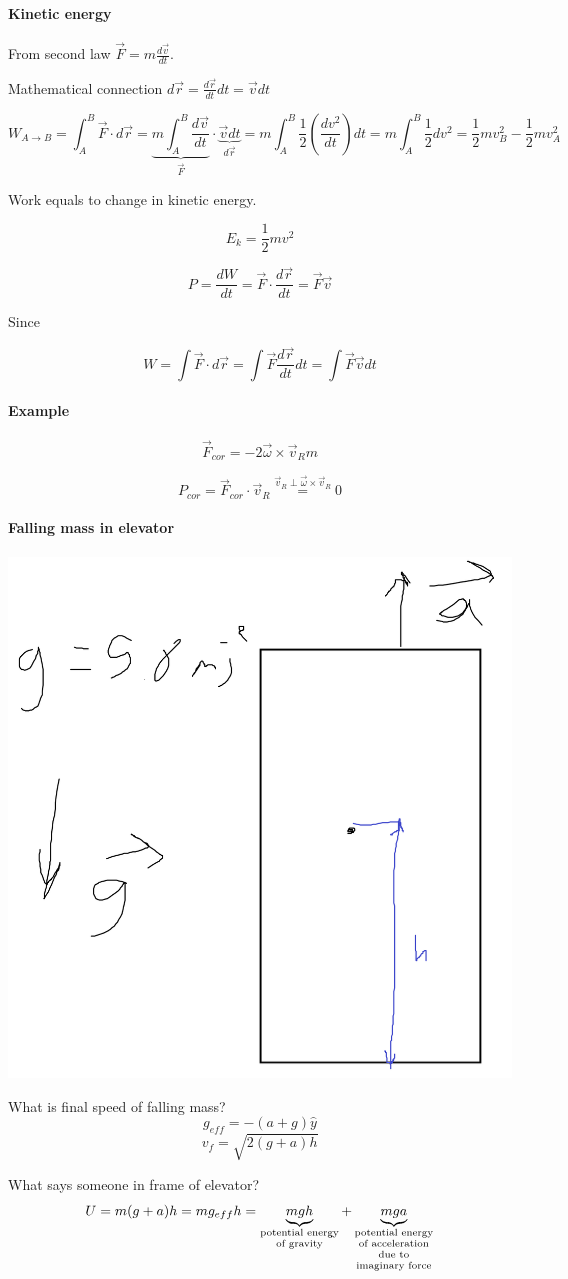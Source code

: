 \paragraph{Kinetic energy}

From second law $\vec{F}=m\frac{d\vec{v}}{dt}$.

Mathematical connection $d\vec{r} = \frac{d\vec{r}}{dt}dt = \vec{v}dt$

$$W_{A\to B} = \int_{A}^{B}\vec{F}\cdot{d\vec{r}} = \underbrace{m \int_{A}^{B} \frac{d\vec{v}}{dt} }_{\vec{F}}\cdot \underbrace{\vec{v} dt}_{d\vec{r}} = m\int_{A}^{B} \frac{1}{2}\left( \frac{dv^2}{dt} \right) dt = m \int_{A}^{B} \frac{1}{2} dv^2=\frac{1}{2}mv^2_B - \frac{1}{2}mv^2_A$$

Work equals to change in kinetic energy.

$$E_k = \frac{1}{2}mv^2$$

$$P = \frac{dW}{dt} = \vec{F} \cdot \frac{d\vec{r}}{dt} = \vec{F} \vec{v}$$

Since

$$W = \int \vec{F} \cdot d\vec{r} = \int \vec{F} \frac{d\vec{r}}{dt} dt = \int \vec{F} \vec{v} dt$$

\paragraph{Example}
$$\vec{F}_{cor} = -2 \vec{\omega} \times \vec{v}_R m$$

$$P_{cor} = \vec{F}_{cor} \cdot \vec{v}_R \stackrel{\vec{v}_R \perp \vec{\omega} \times \vec{v}_R}{=} 0$$

\paragraph{Falling mass in elevator}


\begin{center}
	\includegraphics[width=0.2\linewidth]{./lect10/pic1.png}
\end{center}
What is final speed of falling mass?
$$g_{eff} = -(a+g)\hat{y}$$
$$v_f = \sqrt{2\left(g+a\right)h}$$

What says someone in frame of elevator?
$$U=m(g+a)h = mg_{eff}h = \underbrace{mgh}_{\parbox{2cm}{\centering \scriptsize potential energy of gravity}} + \underbrace{mga}_{\parbox{2cm}{\centering \scriptsize potential energy of acceleration due to imaginary force}}$$

